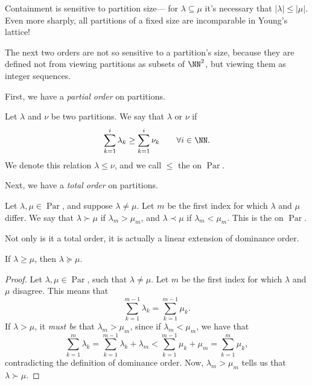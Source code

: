 \documentclass{article}
\DeclareMathOperator{\Par}{Par}
\begin{document}
Containment is sensitive to partition size--- for $\lambda \subseteq \mu$ it's necessary that $|\lambda| \leq |\mu|$.
Even more sharply, all partitions of a fixed size are incomparable in Young's lattice!

The next two orders are not so sensitive to a partition's size, because they are defined not from viewing partitions as subsets of $\NN^2$, but viewing them as integer sequences.

First, we have a \textit{partial order} on partitions.

\begin{definition}
    Let $\lambda$ and $\nu$ be two partitions. We say that $\lambda$  or  $\nu$ if
    \[
        \sum_{k=1}^i \lambda_k \geq \sum_{k=1}^i \nu_k \qquad \forall i\in\NN.
    \]
    We denote this relation $\lambda \leq \nu$, and we call $\leq$ the  on $\Par$.
\end{definition}

Next, we have a \textit{total order} on partitions.

\begin{definition}
    Let $\lambda, \mu \in \Par$, and suppose $\lambda \neq \mu$.
    Let $m$ be the first index for which $\lambda$ and $\mu$ differ.
    We say that $\lambda \succ \mu$ if $\lambda_m > \mu_m$, and $\lambda \prec \mu$ if $\lambda_m < \mu_m$.
    This is the  on $\Par$.
\end{definition}

Not only is it a total order, it is actually a linear extension of dominance order.

\begin{theorem}
    If $\lambda \geq \mu$, then $\lambda \succeq \mu$.
\end{theorem}

\begin{proof}
    Let $\lambda, \mu \in \Par$, such that $\lambda \neq \mu$.
    Let $m$ be the first index for which $\lambda$ and $\mu$ disagree.
    This means that
    \[
        \sum_{k=1}^{m-1} \lambda_k = \sum_{k=1}^{m-1} \mu_k.
    \]
    If $\lambda > \mu$, it \textit{must be} that $\lambda_m > \mu_m$, since if $\lambda_m < \mu_m$, we have that
    \[
        \sum_{k=1}^m \lambda_k = \sum_{k=1}^{m-1} \lambda_k + \lambda_m < \sum_{k=1}^{m-1} \mu_k + \mu_m = \sum_{k=1}^m \mu_k,
    \]
    contradicting the definition of dominance order.
    Now, $\lambda_m > \mu_m$ tells us that $\lambda \succ \mu$.
\end{proof}
\end{document}
